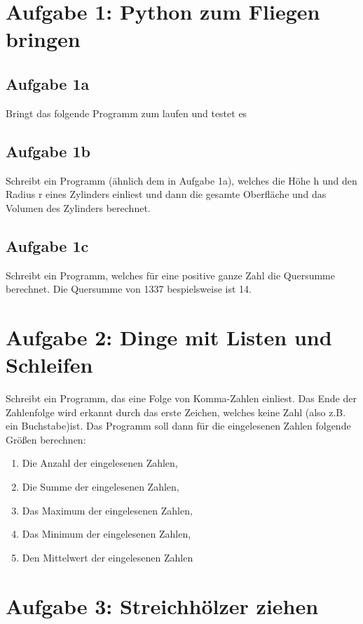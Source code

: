
\section{Aufgabe 1: Python zum Fliegen bringen}

\subsection{Aufgabe 1a}
Bringt das folgende Programm zum laufen und testet es

\subsection{Aufgabe 1b}
Schreibt ein Programm (ähnlich dem in Aufgabe 1a), welches die Höhe h und den Radius r
eines Zylinders einliest und dann die gesamte Oberfläche und das Volumen des Zylinders berechnet.

\subsection{Aufgabe 1c}
Schreibt ein Programm, welches für eine positive ganze Zahl die Quersumme
berechnet. Die Quersumme von 1337 bespielsweise ist 14.

\newpage
\section{Aufgabe 2: Dinge mit Listen und Schleifen}
Schreibt ein Programm, das eine Folge von Komma-Zahlen einliest. Das Ende
der Zahlenfolge wird erkannt durch das erste Zeichen, welches keine Zahl (also z.B. ein Buchstabe)ist.
Das Programm soll dann für die eingelesenen Zahlen folgende Größen berechnen:
\begin{enumerate}
\item Die Anzahl der eingelesenen Zahlen,
\item Die Summe der eingelesenen Zahlen,
\item Das Maximum der eingelesenen Zahlen,
\item Das Minimum der eingelesenen Zahlen,
\item Den Mittelwert der eingelesenen Zahlen
\end{enumerate}

\newpage
\section{Aufgabe 3: Streichhölzer ziehen}


